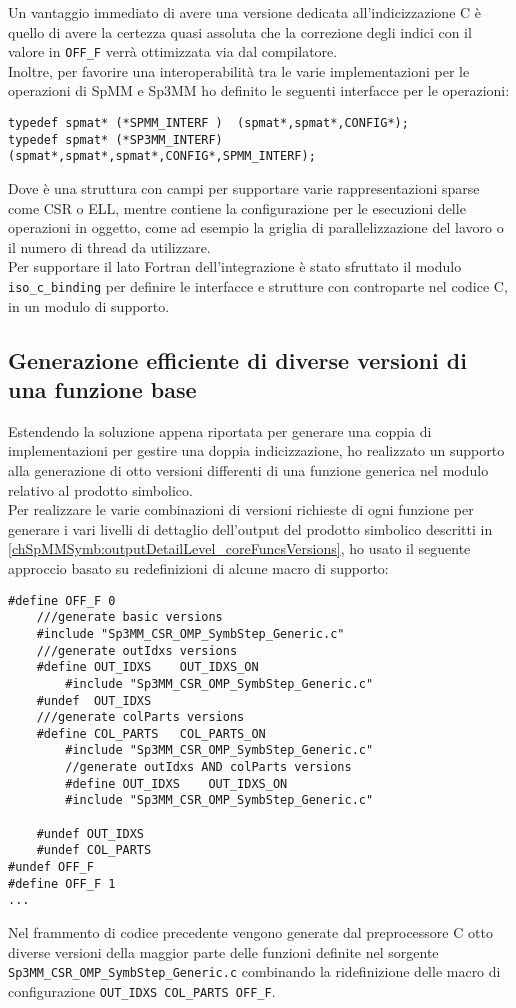 Un vantaggio immediato di avere una versione dedicata all'indicizzazione C è quello di avere la certezza 
quasi assoluta che la correzione degli indici con il valore  in \verb|OFF_F| verrà ottimizzata via dal compilatore.\\
Inoltre, per favorire una interoperabilità tra le varie implementazioni per le operazioni di SpMM e Sp3MM 
ho definito le seguenti interfacce per le operazioni:
\begin{lstlisting}
typedef spmat* (*SPMM_INTERF )  (spmat*,spmat*,CONFIG*);
typedef spmat* (*SP3MM_INTERF)  (spmat*,spmat*,spmat*,CONFIG*,SPMM_INTERF);
\end{lstlisting}
Dove  è una struttura con campi per supportare varie rappresentazioni sparse 
come CSR o ELL, mentre  contiene la configurazione per le esecuzioni delle operazioni in oggetto,
come ad esempio la griglia di parallelizzazione del lavoro o il numero di thread da utilizzare.\\

Per supportare il lato Fortran dell'integrazione è stato sfruttato il modulo \verb|iso_c_binding| 
per definire le interfacce e strutture con controparte nel codice C, in un modulo di supporto.\\

\subsection{Generazione efficiente di diverse versioni di una funzione base}	\label{chSpMMAux:multiImplMany}
Estendendo la soluzione appena riportata per generare una coppia di implementazioni per gestire una doppia indicizzazione,
ho realizzato un supporto alla generazione di otto versioni differenti di una funzione generica nel modulo relativo al prodotto simbolico.\\
Per realizzare le varie combinazioni di versioni richieste di ogni funzione per generare i vari livelli di dettaglio dell'output 
del prodotto simbolico descritti in \ref{chSpMMSymb:outputDetailLevel_coreFuncsVersions},
ho usato il seguente approccio basato su redefinizioni di alcune macro di supporto:\\
\begin{lstlisting}
#define OFF_F 0
	///generate basic versions
	#include "Sp3MM_CSR_OMP_SymbStep_Generic.c"
	///generate outIdxs versions
	#define OUT_IDXS 	OUT_IDXS_ON	
		#include "Sp3MM_CSR_OMP_SymbStep_Generic.c"
	#undef  OUT_IDXS
	///generate colParts versions
	#define COL_PARTS	COL_PARTS_ON
		#include "Sp3MM_CSR_OMP_SymbStep_Generic.c"
		//generate outIdxs AND colParts versions
		#define OUT_IDXS 	OUT_IDXS_ON
		#include "Sp3MM_CSR_OMP_SymbStep_Generic.c"

	#undef OUT_IDXS
	#undef COL_PARTS
#undef OFF_F
#define OFF_F 1
...
\end{lstlisting}
Nel frammento di codice precedente vengono generate dal preprocessore C otto diverse versioni
della maggior parte delle funzioni definite nel sorgente \\ \verb|Sp3MM_CSR_OMP_SymbStep_Generic.c|
combinando la ridefinizione delle macro di configurazione \verb|OUT_IDXS COL_PARTS OFF_F|.\\

